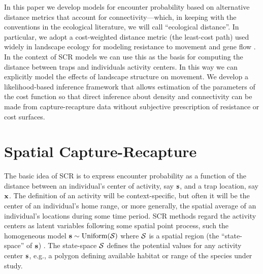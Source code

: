 \documentclass[12pt]{article}
\begin{document}
\begin{spacing}{1.8}
In this paper we develop models for encounter probability based on
alternative distance metrics that account for
connectivity---which, in keeping with the conventions in the
ecological literature, we will call ``ecological distance''. In
particular, we adopt a cost-weighted distance metric (the least-cost path)
used widely in landscape ecology for modeling resistance to movement
and gene flow \citep{adriaensen_etal:2003}. In the
context of SCR models we can use this as the basis for computing the
distance between traps and individuals activity centers. In this way
we can explicitly model the effects of %
landscape structure on movement.
We develop a likelihood-based inference framework that allows
estimation of the parameters of the cost function
so that direct inference about density and connectivity can be made
from capture-recapture data without subjective prescription
of resistance or cost surfaces.


\section{Spatial Capture-Recapture}

The basic idea of SCR is to express encounter probability %
as a function of the distance between an individual's center of
activity, say ${\bf s}$, and a trap location, say ${\bf x}$. The
definition of an activity will be context-specific, but often it will
be the center of an individual's home range, or more generally, the
spatial average of an individual's locations during some time
period. SCR methods regard the activity centers as latent variables
following some spatial point process, such the homogeneous
model ${\bf s} \sim \mbox{Uniform}({\cal
  S})$ where ${\cal S}$ is a spatial region (the ``state-space'' of
${\bf s}$)
\citep{borchers_efford:2008}. The state-space ${\cal S}$
defines the potential values for any activity center ${\bf s}$, e.g.,
a polygon defining available habitat or range of the species under study.



\end{spacing}
\end{document}
